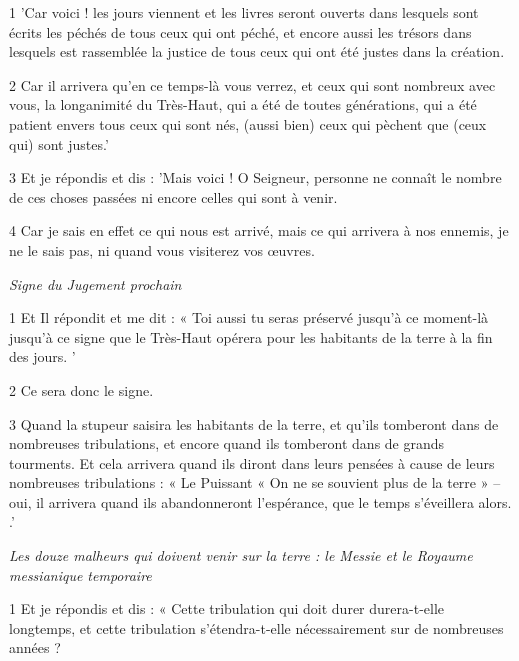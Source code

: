 \par 1 'Car voici ! les jours viennent et les livres seront ouverts dans lesquels sont écrits les péchés de tous ceux qui ont péché, et encore aussi les trésors dans lesquels est rassemblée la justice de tous ceux qui ont été justes dans la création.

\par 2 Car il arrivera qu'en ce temps-là vous verrez, et ceux qui sont nombreux avec vous, la longanimité du Très-Haut, qui a été de toutes générations, qui a été patient envers tous ceux qui sont nés, (aussi bien) ceux qui pèchent que (ceux qui) sont justes.'

\par 3 Et je répondis et dis : 'Mais voici ! O Seigneur, personne ne connaît le nombre de ces choses passées ni encore celles qui sont à venir.

\par 4 Car je sais en effet ce qui nous est arrivé, mais ce qui arrivera à nos ennemis, je ne le sais pas, ni quand vous visiterez vos œuvres.


\par \textit{Signe du Jugement prochain}

\par 1 Et Il répondit et me dit : « Toi aussi tu seras préservé jusqu'à ce moment-là jusqu'à ce signe que le Très-Haut opérera pour les habitants de la terre à la fin des jours. '

\par 2 Ce sera donc le signe.

\par 3 Quand la stupeur saisira les habitants de la terre, et qu'ils tomberont dans de nombreuses tribulations, et encore quand ils tomberont dans de grands tourments. Et cela arrivera quand ils diront dans leurs pensées à cause de leurs nombreuses tribulations : « Le Puissant « On ne se souvient plus de la terre » – oui, il arrivera quand ils abandonneront l’espérance, que le temps s’éveillera alors. .'


\par \textit{Les douze malheurs qui doivent venir sur la terre : le Messie et le Royaume messianique temporaire}

\par 1 Et je répondis et dis : « Cette tribulation qui doit durer durera-t-elle longtemps, et cette tribulation s'étendra-t-elle nécessairement sur de nombreuses années ?

